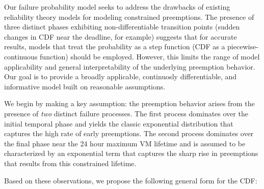 Our failure probability model seeks to address the drawbacks of existing reliability theory models for modeling constrained preemptions. 
The presence of three distinct phases exhibiting non-differentiable transition points (sudden changes in CDF near the deadline, for example) suggests that for accurate results, models that treat the probability as a step function (CDF as a piecewise-continuous function) should be employed. However, this limits the range of model applicability and general interpretability of the underlying preemption behavior. Our goal is to provide a broadly applicable, continuosly differentiable, and informative model built on reasonable assumptions.  

We begin by making a key assumption: the preemption behavior arises from the presence of \emph{two} distinct failure processes.
The first process dominates over the initial temporal phase and yields the classic exponential distribution that captures the high rate of early preemptions.
The second process dominates over the final phase near the 24 hour maximum VM lifetime and is assumed to be characterized by an exponential term that captures the sharp rise in preemptions that results from this constrained lifetime. 

%
%

Based on these observations, we propose the following general form for the CDF:

